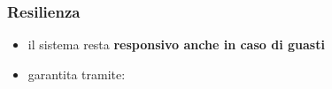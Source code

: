 \begin{frame}[c]{\insertsectionhead}{\insertsubsectionhead}
\begin{columns}
\begin{column}{.47\textwidth}
                    \subsubsection{Resilienza}\label{subsub:resiliency}
                    \begin{block}{\insertsubsubsectionhead}
                        \begin{itemize}
                            \item
                                il sistema resta \textbf{responsivo anche in caso di guasti}
                            \item
                                garantita tramite:
                        \end{itemize}
                    \end{block}
                \end{column}
            \end{columns}
        \end{frame}
